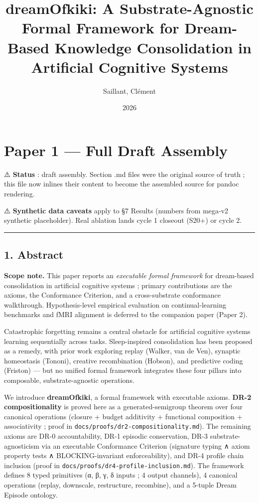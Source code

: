 \documentclass[
]{article}
\title{dreamOfkiki: A Substrate-Agnostic Formal Framework for
Dream-Based Knowledge Consolidation in Artificial Cognitive Systems}
\author{Saillant, Clément}
\date{2026}
\begin{document}
\maketitle

\section{Paper 1 --- Full Draft
Assembly}\label{paper-1-full-draft-assembly}

⚠️ \textbf{Status} : draft assembly. Section .md files were the original
source of truth ; this file now inlines their content to become the
assembled source for pandoc rendering.

⚠️ \textbf{Synthetic data caveats} apply to §7 Results (numbers from
mega-v2 synthetic placeholder). Real ablation lands cycle 1 closeout
(S20+) or cycle 2.

\begin{center}\rule{0.5\linewidth}{0.5pt}\end{center}

\subsection{1. Abstract}\label{abstract}

\textbf{Scope note.} This paper reports an \emph{executable formal
framework} for dream-based consolidation in artificial cognitive systems
; primary contributions are the axioms, the Conformance Criterion, and a
cross-substrate conformance walkthrough. Hypothesis-level empirical
evaluation on continual-learning benchmarks and fMRI alignment is
deferred to the companion paper (Paper 2).

Catastrophic forgetting remains a central obstacle for artificial
cognitive systems learning sequentially across tasks. Sleep-inspired
consolidation has been proposed as a remedy, with prior work exploring
replay (Walker, van de Ven), synaptic homeostasis (Tononi), creative
recombination (Hobson), and predictive coding (Friston) --- but no
unified formal framework integrates these four pillars into composable,
substrate-agnostic operations.

We introduce \textbf{dreamOfkiki}, a formal framework with executable
axioms. \textbf{DR-2 compositionality} is proved here as a
generated-semigroup theorem over four canonical operations (closure +
budget additivity + functional composition + associativity ; proof in
\texttt{docs/proofs/dr2-compositionality.md}). The remaining axioms are
DR-0 accountability, DR-1 episodic conservation, DR-3
substrate-agnosticism via an executable Conformance Criterion (signature
typing ∧ axiom property tests ∧ BLOCKING-invariant enforceability), and
DR-4 profile chain inclusion (proof in
\texttt{docs/proofs/dr4-profile-inclusion.md}). The framework defines 8
typed primitives (α, β, γ, δ inputs ; 4 output channels), 4 canonical
operations (replay, downscale, restructure, recombine), and a 5-tuple
Dream Episode ontology.
\end{document}
